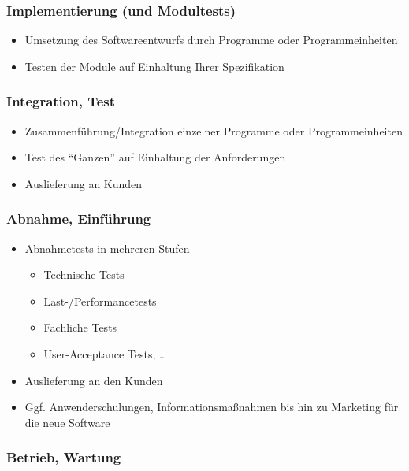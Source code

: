 \documentclass[11pt, a4paper]{article}
\begin{document}
\subsubsection*{Implementierung (und Modultests)}

\begin{itemize}
    \item Umsetzung des Softwareentwurfs durch Programme oder Programmeinheiten
    \item Testen der Module auf Einhaltung Ihrer Spezifikation
\end{itemize}

\subsubsection*{Integration, Test}

\begin{itemize}
    \item Zusammenführung/Integration einzelner Programme oder Programmeinheiten
    \item Test des “Ganzen” auf Einhaltung der Anforderungen
    \item Auslieferung an Kunden
\end{itemize}

\subsubsection*{Abnahme, Einführung}

\begin{itemize}
    \item Abnahmetests in mehreren Stufen
    \begin{itemize}
        \item Technische Tests
        \item Last-/Performancetests
        \item Fachliche Tests
        \item User-Acceptance Tests, …
    \end{itemize}
    \item Auslieferung an den Kunden
    \item Ggf. Anwenderschulungen, Informationsmaßnahmen bis hin zu Marketing für die neue Software
\end{itemize}

\subsubsection*{Betrieb, Wartung}
\end{document}

